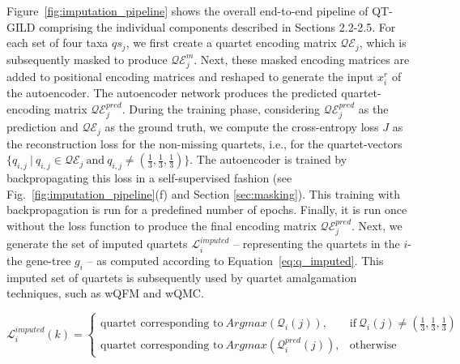 Figure~\ref{fig:imputation_pipeline} shows the overall end-to-end pipeline of QT-GILD comprising the individual components described in Sections 2.2-2.5. For each set of four taxa $qs_j$, we first create a quartet encoding matrix $\mathcal{QE}_j$, which is subsequently masked to produce $\mathcal{QE}^m_j$. Next, these masked encoding matrices are added to positional encoding matrices and reshaped to generate the input $x_i^r$ of the autoencoder. The autoencoder network produces the predicted quartet-encoding matrix $\mathcal{QE}^{pred}_j$. During the training phase, considering $\mathcal{QE}^{pred}_j$ as the prediction and $\mathcal{QE}_j$ as the ground truth, we compute the cross-entropy loss $J$ as the reconstruction loss for the non-missing quartets, i.e., for the quartet-vectors $\{q_{i,j} ~|~ q_{i,j} \in \mathcal{QE}_j ~\mbox{and}~ q_{i,j} \neq (\frac{1}{3},\frac{1}{3},\frac{1}{3})\}$. The autoencoder is trained by backpropagating  this loss in a self-supervised fashion (see Fig.~\ref{fig:imputation_pipeline}(f) and Section \ref{sec:masking}). This training with backpropagation is run for a predefined number of epochs. Finally, it is run once without the loss function to produce the final encoding matrix $\mathcal{QE}^{pred}_j$. %
Next, we generate the set of imputed quartets  $\mathcal{L}^{imputed}_i$ -- representing the quartets in the $i$-the gene-tree $g_i$ -- as computed according to Equation~\ref{eq:q_imputed}. This imputed set of quartets is subsequently used by quartet amalgamation techniques, such as wQFM and wQMC.

\vspace{-5pt}
\begin{equation}
\label{eq:q_imputed}
    \mathcal{L}^{imputed}_i(k) = \begin{cases} 
        \mbox{quartet corresponding to}~Argmax(\mathcal{Q}_i(j)), & \mbox{if}~ \mathcal{Q}_i(j) \neq (\frac{1}{3},\frac{1}{3},\frac{1}{3}) \\ 
        \mbox{quartet corresponding to}~Argmax(\mathcal{Q}^{pred}_i(j)), & \mbox{otherwise}   
    \end{cases} 
\end{equation}



